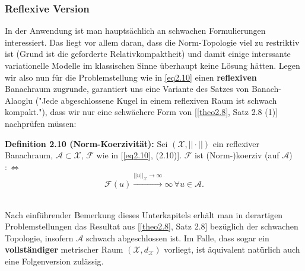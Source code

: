 \subsubsection{Reflexive Version}
In der Anwendung ist man hauptsächlich an schwachen Formulierungen interessiert. Das liegt vor allem daran, dass die Norm-Topologie viel zu restriktiv ist (Grund ist die geforderte Relativkompaktheit) und damit einige interssante variationelle Modelle im klassischen Sinne überhaupt keine Lösung hätten. Legen wir also nun für die Problemstellung wie in \eqref{eq2.10} einen \textbf{reflexiven} Banachraum zugrunde, garantiert uns eine Variante des Satzes von Banach-Alaoglu ("Jede abgeschlossene Kugel in einem reflexiven Raum ist schwach kompakt."), dass wir nur eine schwächere Form von [\ref{theo2.8}, Satz 2.8 (1)] nachprüfen müssen:\\[0.5cm]
\colorbox{generalYellow}{\begin{minipage}{16cm}{\textcolor{black}{}{\label{def2.10}}}
\textbf{Definition 2.10 (Norm-Koerzivität):} Sei \((\mathcal{X},||\cdot||)\) ein reflexiver Banachraum, \(\mathcal{A} \subset \mathcal{X}, \, \mathcal{F}\) wie in [\ref{eq2.10}, (2.10)]. \(\mathcal{F}\) ist (Norm-)koerziv (auf \(\mathcal{A}\)) \(: \Leftrightarrow\)
\begin{equation}
    \mathcal{F}(u) \stackrel{||u||_{\mathcal{X}} \to \infty}{\to} \infty \, \forall u \in \mathcal{A}.
\end{equation}
\end{minipage}}\\

Nach einführender Bemerkung dieses Unterkapitels erhält man in derartigen Problemstellungen das Resultat aus [\ref{theo2.8}, Satz 2.8] bezüglich der schwachen Topologie, insofern \(\mathcal{A}\) schwach abgeschlossen ist. Im Falle, dass sogar ein \textbf{vollständiger} metrischer Raum \((\mathcal{X},d_{\mathcal{X}})\) vorliegt, ist äquivalent natürlich auch eine Folgenversion zulässig. 

